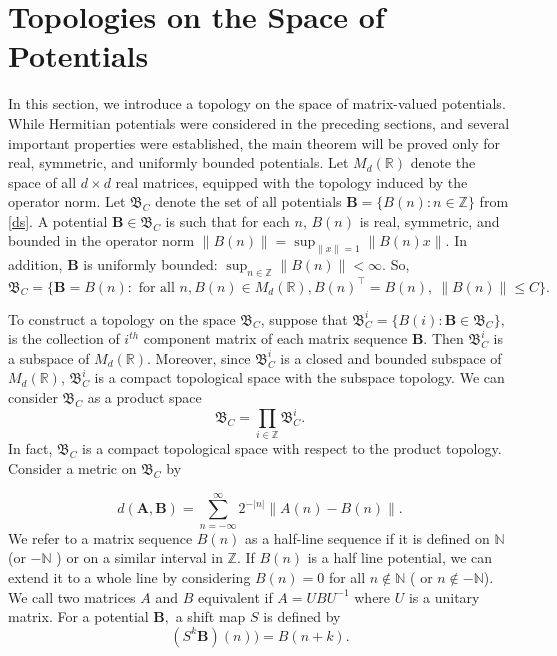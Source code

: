 \documentclass[reqno]{amsart}
\numberwithin{equation}{section}
\newcommand{\R}{\mathbb{R}}
\newcommand{\N}{\mathbb{N}}
\newcommand{\Z}{\mathbb{Z}}
\begin{document}
\section{Topologies on the Space of Potentials}
In this section, we introduce a topology on the space of matrix-valued potentials. While Hermitian potentials were considered in the preceding sections, and several important properties were established, the main theorem will be proved only for real, symmetric, and uniformly bounded potentials. Let 
 $M_d(\R)$ denote the space of all $d \times d $ real matrices, equipped with the topology induced by the operator norm.
   Let $\mathfrak B_C $ denote the set of all potentials $\mathbf B = \{B(n): n\in \Z \}$ from \eqref{ds}. A potential $\mathbf B \in \mathfrak B_C$ is such that for each $n$,  $B(n)$ is real, symmetric, and bounded in the operator norm $ \|B(n)\|  = \sup_{\|x\| =1} \|B(n)x \|. $  In addition, $\mathbf B $
 is uniformly bounded: $  \sup_{n \in \Z} \|B(n) \| < \infty  .$
So, $$
\mathfrak B_C = \{ \mathbf B = B(n):   \text{ for all } n,   B(n) \in   M_d (\R),  B(n)^\top = B(n), \ \|B(n)\|\leq C    \}.
$$
 
To construct a topology on the space $\mathfrak B_C $, suppose that $\mathfrak B_C^i =\{B(i): \mathbf B \in \mathfrak B_C \},$ is the collection of $i^{th}$ component matrix  of each matrix sequence $ \mathbf B $. Then $\mathfrak B_C^i$ is a subspace of $M_d(\R)$.   Moreover, since $\mathfrak B_C^i$ is a closed and bounded subspace of $M_d(\R)$, $\mathfrak B_C^i$ is a compact topological space with the subspace topology. We can consider $\mathfrak B_C $ as a product space $$\mathfrak B_C = \prod _{i\in \Z} \mathfrak B_C^i  .$$ In fact, $\mathfrak B_C$ is a compact topological space with respect to the product topology. Consider a metric on $\mathfrak B_C$ by 

\begin{equation} \label{metric} 
d(\mathbf A, \mathbf B)=  \sum_{n=-\infty}^{\infty} 2^{-|n|}\|A(n)-B(n)\|.
\end{equation}
We refer to a matrix sequence $B(n)$ as a half-line sequence if it is defined on $\N $ (or $- \N $ ) or on a similar interval in $\Z$. If $B(n)$ is a half line potential, we can extend it to a whole line by considering $B(n) = 0 $ for all $n \not \in \N$
 ( or $n \not \in - \N$).  We call two matrices $A$ and $B$ equivalent if $ A = U B U^{-1}$ where $U$ is a unitary matrix. For a potential $ \mathbf B, $ a shift map $S$  is defined by  $$ (S^k \mathbf B)(n))=B(n+k).$$
\end{document}
